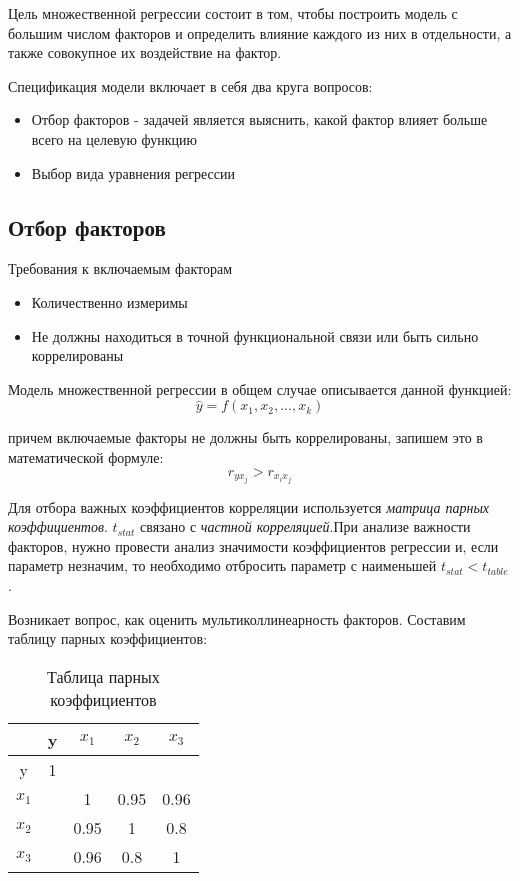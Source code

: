 \documentclass[aps,%
12pt,%
final,%
oneside,
onecolumn,%
musixtex, %
superscriptaddress,%
centertags]{article} %
\begin{document}
Цель множественной регрессии состоит в том, чтобы построить модель с большим числом факторов и определить влияние каждого из них в отдельности, а также совокупное их воздействие на фактор.

Спецификация модели включает в себя два круга вопросов:

\begin{itemize}
	\item Отбор факторов - задачей является выяснить, какой фактор влияет больше всего на целевую функцию
	\item Выбор вида уравнения регрессии
\end{itemize}
\subsection{Отбор факторов}

Требования к включаемым факторам

\begin{itemize}
	\item Количественно измеримы
	\item Не должны находиться в точной функциональной связи или быть сильно коррелированы
\end{itemize}

Модель множественной регрессии в общем случае описывается данной функцией:
$$ \widehat{y} = f(x_1,x_2,...,x_k) $$

причем включаемые факторы не должны быть коррелированы, запишем это в математической формуле:
$$ r_{yx_j} > r_{x_i{x_j}} $$

Для отбора важных коэффициентов корреляции используется \textit{матрица парных коэффициентов}. 
$t_{stat}$ связано с \textit{частной корреляцией}.При анализе важности факторов, нужно провести анализ значимости коэффициентов регрессии и, если параметр незначим, то необходимо отбросить параметр с наименьшей $t_{stat}< t_{table}$.

Возникает вопрос, как оценить мультиколлинеарность факторов. Составим таблицу парных коэффициентов:
\begin{table}[H]
	\begin{center}
		\begin{tabular}{|c|c|c|c|c|} \hline
		& y & $x_1$ & $x_2$ & $x_3$ \\ \hline
		y & 1 &  &  &   \\ \hline
		$x_1$ &  & 1 & 0.95 & 0.96 \\ \hline
		$x_2$ &  & 0.95 & 1 & 0.8 \\ \hline
		$x_3$ &  & 0.96 & 0.8 & 1 \\ \hline
		\end{tabular}
	\caption{Таблица парных коэффициентов}
	\end{center}
\end{table}
\end{document}
